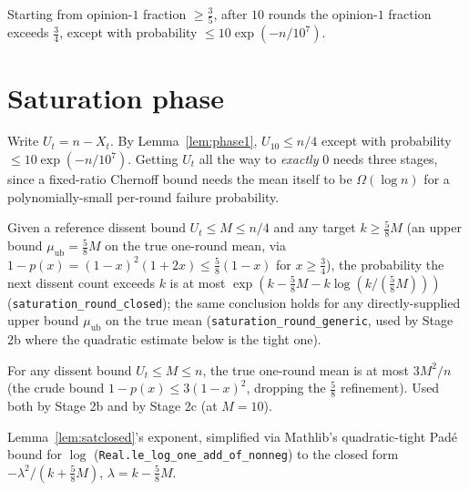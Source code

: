 \begin{lemma}[Phase 1]\label{lem:phase1}
  \leanok
  Starting from opinion-$1$ fraction $\ge\tfrac35$, after $10$ rounds the
  opinion-$1$ fraction exceeds $\tfrac34$, except with probability
  $\le10\exp(-n/10^7)$.
\end{lemma}

\section{Saturation phase}\label{sec:saturation}

Write $U_t = n-X_t$. By Lemma~\ref{lem:phase1}, $U_{10}\le n/4$ except with
probability $\le10\exp(-n/10^7)$. Getting $U_t$ all the way to
\emph{exactly} $0$ needs three stages, since a fixed-ratio Chernoff bound
needs the mean itself to be $\Omega(\log n)$ for a polynomially-small
per-round failure probability.

\begin{lemma}\label{lem:satclosed}
  \leanok
  Given a reference dissent bound $U_t\le M\le n/4$ and any target
  $k\ge\tfrac58M$ (an upper bound $\mu_{\mathrm{ub}}=\tfrac58M$ on the true
  one-round mean, via $1-p(x)=(1-x)^2(1+2x)\le\tfrac58(1-x)$ for
  $x\ge\tfrac34$), the probability the next dissent count exceeds $k$ is at
  most $\exp(k-\tfrac58M-k\log(k/(\tfrac58M)))$
  (\texttt{saturation\_round\_closed}); the same conclusion holds for any
  directly-supplied upper bound $\mu_{\mathrm{ub}}$ on the true mean
  (\texttt{saturation\_round\_generic}, used by Stage 2b where the
  quadratic estimate below is the tight one).
\end{lemma}

\begin{lemma}\label{lem:satquad}
  \leanok
  For any dissent bound $U_t\le M\le n$, the true one-round mean is at most
  $3M^2/n$ (the crude bound $1-p(x)\le3(1-x)^2$, dropping the $\tfrac58$
  refinement). Used both by Stage 2b and by Stage 2c (at $M=10$).
\end{lemma}

\begin{lemma}\label{lem:satnumeric}
  \leanok
  Lemma~\ref{lem:satclosed}'s exponent, simplified via Mathlib's
  quadratic-tight Pad\'e bound for $\log$
  (\texttt{Real.le\_log\_one\_add\_of\_nonneg}) to the closed form
  $-\lambda^2/(k+\tfrac58M)$, $\lambda=k-\tfrac58M$.
\end{lemma}

